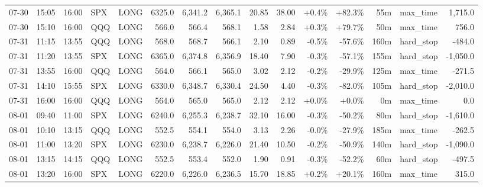 \documentclass[11pt,a4paper,twoside]{article}
\begin{document}
\begin{landscape}
\begin{center}
\begin{longtable}{>{\color{txtmain}}l l l l l r r r r r r r r >{\color{txtmain}}l r}
07-30 & 15:05 & 16:00 & SPX & LONG & 6325.0 & 6,341.2 & 6,365.1 & 20.85 & 38.00 & \textcolor{wingreen}{+0.4\%} & \textcolor{wingreen}{+82.3\%} & 55m & max\_time & \textcolor{wingreen}{1,715.0} \\
07-30 & 15:10 & 16:00 & QQQ & LONG & 566.0 & 566.4 & 568.1 & 1.58 & 2.84 & \textcolor{wingreen}{+0.3\%} & \textcolor{wingreen}{+79.7\%} & 50m & max\_time & \textcolor{wingreen}{756.0} \\
07-31 & 11:15 & 13:55 & QQQ & LONG & 568.0 & 568.7 & 566.1 & 2.10 & 0.89 & \textcolor{lossred}{-0.5\%} & \textcolor{lossred}{-57.6\%} & 160m & hard\_stop & \textcolor{lossred}{-484.0} \\
07-31 & 11:20 & 13:55 & SPX & LONG & 6365.0 & 6,374.8 & 6,356.9 & 18.40 & 7.90 & \textcolor{lossred}{-0.3\%} & \textcolor{lossred}{-57.1\%} & 155m & hard\_stop & \textcolor{lossred}{-1,050.0} \\
07-31 & 13:55 & 16:00 & QQQ & LONG & 564.0 & 566.1 & 565.0 & 3.02 & 2.12 & \textcolor{lossred}{-0.2\%} & \textcolor{lossred}{-29.9\%} & 125m & max\_time & \textcolor{lossred}{-271.5} \\
07-31 & 14:10 & 15:55 & SPX & LONG & 6330.0 & 6,348.7 & 6,330.4 & 24.50 & 4.40 & \textcolor{lossred}{-0.3\%} & \textcolor{lossred}{-82.0\%} & 105m & hard\_stop & \textcolor{lossred}{-2,010.0} \\
07-31 & 16:00 & 16:00 & QQQ & LONG & 564.0 & 565.0 & 565.0 & 2.12 & 2.12 & \textcolor{wingreen}{+0.0\%} & \textcolor{wingreen}{+0.0\%} & 0m & max\_time & \textcolor{wingreen}{0.0} \\
08-01 & 09:40 & 11:00 & SPX & LONG & 6240.0 & 6,255.3 & 6,238.7 & 32.10 & 16.00 & \textcolor{lossred}{-0.3\%} & \textcolor{lossred}{-50.2\%} & 80m & hard\_stop & \textcolor{lossred}{-1,610.0} \\
08-01 & 10:10 & 13:15 & QQQ & LONG & 552.5 & 554.1 & 554.0 & 3.13 & 2.26 & \textcolor{lossred}{-0.0\%} & \textcolor{lossred}{-27.9\%} & 185m & max\_time & \textcolor{lossred}{-262.5} \\
08-01 & 11:00 & 13:20 & SPX & LONG & 6230.0 & 6,238.7 & 6,226.0 & 21.40 & 10.50 & \textcolor{lossred}{-0.2\%} & \textcolor{lossred}{-50.9\%} & 140m & hard\_stop & \textcolor{lossred}{-1,090.0} \\
08-01 & 13:15 & 14:15 & QQQ & LONG & 552.5 & 553.4 & 552.0 & 1.90 & 0.91 & \textcolor{lossred}{-0.3\%} & \textcolor{lossred}{-52.2\%} & 60m & hard\_stop & \textcolor{lossred}{-497.5} \\
08-01 & 13:20 & 16:00 & SPX & LONG & 6220.0 & 6,226.0 & 6,236.5 & 15.70 & 18.85 & \textcolor{wingreen}{+0.2\%} & \textcolor{wingreen}{+20.1\%} & 160m & max\_time & \textcolor{wingreen}{315.0} \\

\end{longtable}
\end{center}
\end{landscape}
\end{document}
